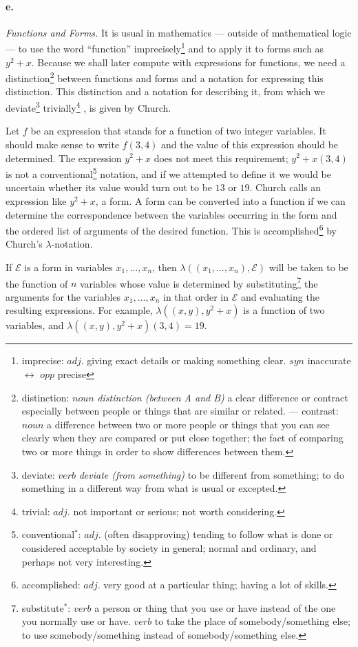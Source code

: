 \documentclass[11pt, a4paper]{article}
\begin{document}
\paragraph{e.}\textit{Functions and Forms.}
It is usual in mathematics --- outside of mathematical logic --- to use the word
``function''
imprecisely\footnote{imprecise: $adj.$ giving exact details or making something
  clear. $syn$ inaccurate $\leftrightarrow$ $opp$ precise}
and to apply it to forms such as $y^2 + x$. Because we
shall later compute with expressions for functions, we need a
distinction\footnote{distinction: $noun$ \textit{distinction (between A and B)}
  a clear difference or contract especially between people or things that are
  similar or related. --- contrast: $noun$ a difference between two or more
  people or things that you can see clearly when they are compared or put close
  together; the fact of comparing two or more things in order to show
  differences between them.}
between functions and forms and a notation for expressing this distinction. This
distinction and a notation for describing it, from which we
deviate\footnote{deviate: $verb$ \textit{deviate (from something)} to be
  different from something; to do something in a different way from  what is
  usual or excepted.}
trivially\footnote{trivial: $adj.$ not important or serious; not worth
  considering.}
,
is given by Church.

Let $f$ be an expression that stands for a function of two integer variables. It
should make sense to write $f(3, 4)$ and the value of this expression should be
determined. The expression $y^2 + x$ does not meet this requirement; $y^2 + x(3,
4)$ is not a
conventional\footnote{conventional$^*$: $adj.$ (often disapproving) tending to
  follow what is done or considered acceptable by society in general; normal and
  ordinary, and perhaps not very interesting.}
notation, and if we attempted to define it we would be
uncertain whether its value would turn out to be $13$ or $19$. Church calls an
expression like $y^2 + x$, a form. A form can be converted into a function if we
can determine the correspondence between the variables occurring in the form and
the ordered list of arguments of the desired function. This is
accomplished\footnote{accomplished: $adj.$ very good at a particular thing;
  having a lot of skills.}
by
Church's $\lambda$-notation.

If $\mathcal{E}$ is a form in variables $x_1, \ldots, x_n$, then $\lambda((x_1,
\ldots, x_n), \mathcal{E})$ will be taken to be the function of $n$ variables
whose value is determined by
substituting\footnote{substitute$^*$: $verb$ a person or thing that you use or
  have instead of the one you normally use or have. $verb$ to take the place of
  somebody/something else; to use somebody/something instead of
  somebody/something else.}
the arguments for the variables $x_1,
\ldots, x_n$ in that order in $\mathcal{E}$ and evaluating the resulting
expressions. For example, $\lambda((x, y), y^2 + x)$ is a function of two
variables, and $\lambda((x, y), y^2 + x)(3, 4) = 19$.
\end{document}
